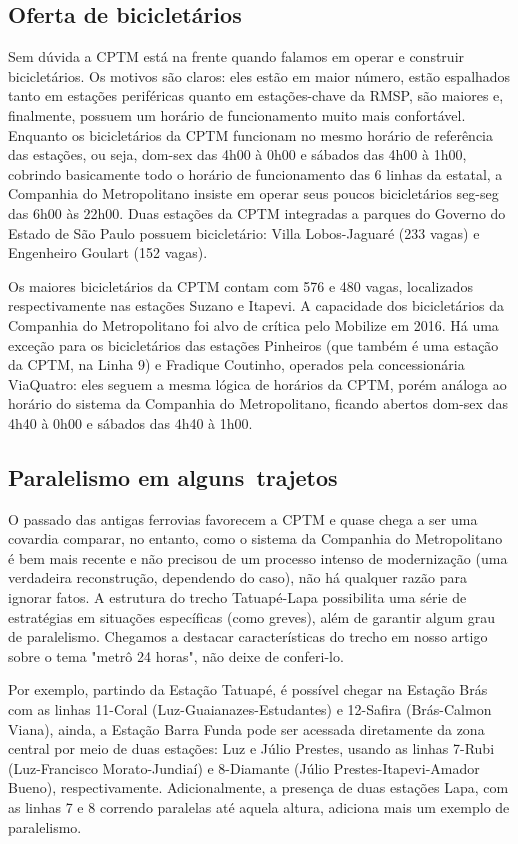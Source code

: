 \documentclass[11pt,fleqn]{book} %
\begin{document}
\subsection{Oferta de bicicletários}

Sem dúvida a CPTM está na frente quando falamos em operar e construir bicicletários. Os motivos são claros: eles estão em maior número, estão espalhados tanto em estações periféricas quanto em estações-chave da RMSP, são maiores e, finalmente, possuem um horário de funcionamento muito mais confortável. Enquanto os bicicletários da CPTM funcionam no mesmo horário de referência das estações, ou seja, dom-sex das 4h00 à 0h00 e sábados das 4h00 à 1h00, cobrindo basicamente todo o horário de funcionamento das 6 linhas da estatal, a Companhia do Metropolitano insiste em operar seus poucos bicicletários seg-seg das 6h00 às 22h00. Duas estações da CPTM integradas a parques do Governo do Estado de São Paulo possuem bicicletário: Villa Lobos-Jaguaré (233 vagas) e Engenheiro Goulart (152 vagas).

Os maiores bicicletários da CPTM contam com 576 e 480 vagas, localizados respectivamente nas estações Suzano e Itapevi. A capacidade dos bicicletários da Companhia do Metropolitano foi alvo de crítica pelo Mobilize em 2016. Há uma exceção para os bicicletários das estações Pinheiros (que também é uma estação da CPTM, na Linha 9) e Fradique Coutinho, operados pela concessionária ViaQuatro: eles seguem a mesma lógica de horários da CPTM, porém análoga ao horário do sistema da Companhia do Metropolitano, ficando abertos dom-sex das 4h40 à 0h00 e sábados das 4h40 à 1h00.

\subsection{Paralelismo em alguns trajetos}

O passado das antigas ferrovias favorecem a CPTM e quase chega a ser uma covardia comparar, no entanto, como o sistema da Companhia do Metropolitano é bem mais recente e não precisou de um processo intenso de modernização (uma verdadeira reconstrução, dependendo do caso), não há qualquer razão para ignorar fatos. A estrutura do trecho Tatuapé-Lapa possibilita uma série de estratégias em situações específicas (como greves), além de garantir algum grau de paralelismo. Chegamos a destacar características do trecho em nosso artigo sobre o tema "metrô 24 horas", não deixe de conferi-lo.

Por exemplo, partindo da Estação Tatuapé, é possível chegar na Estação Brás com as linhas 11-Coral (Luz-Guaianazes-Estudantes) e 12-Safira (Brás-Calmon Viana), ainda, a Estação Barra Funda pode ser acessada diretamente da zona central por meio de duas estações: Luz e Júlio Prestes, usando as linhas 7-Rubi (Luz-Francisco Morato-Jundiaí) e 8-Diamante (Júlio Prestes-Itapevi-Amador Bueno), respectivamente. Adicionalmente, a presença de duas estações Lapa, com as linhas 7 e 8 correndo paralelas até aquela altura, adiciona mais um exemplo de paralelismo.
\end{document}
